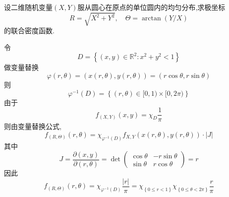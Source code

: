 \documentclass[../main.tex]{subfiles}
\begin{document}
\begin{exercise}{}{}
设二维随机变量\((X,Y)\)服从圆心在原点的单位圆内的均匀分布,求极坐标
\[
R=\sqrt{X^{2}+Y^{2}},\quad \Theta=\operatorname{arctan}(Y/X)
\]
的联合密度函数.
\end{exercise}

\begin{solution}
     令 \[
     D= \left\{\left( x,y \right)\in \mathbb{R} ^{2}:  x^{2}+ y^{2}< 1 \right\}
     \] 做变量替换 \[
     \varphi \left( r, \theta  \right)= \left( x\left( r, \theta  \right),y\left( r, \theta  \right)   \right)= \left( r\cos  \theta , r\sin  \theta  \right) 
      \] 则 \[
       \varphi ^{-1} \left( D \right)= \left\{ \left( r, \theta  \right)\in [0,1)\times [0,2 \pi )  \right\} 
      \]由于\[
      f_{\left( X,Y \right) }\left( x,y \right)=\chi _{D}\frac{1 }{ \pi  }  
      \]则由变量替换公式,  \[
      f_{\left( R, \Theta  \right) }\left( r, \theta  \right)=\chi _{ \varphi ^{-1} \left( D \right) } f_{X,Y}\left( x\left( r, \theta  \right),y\left( r, \theta  \right)   \right)  \cdot \left| J \right| 
      \]其中 \[
      J= \frac{\partial \left( x,y \right) }{\partial \left( r, \theta  \right) }= \det \begin{pmatrix} 
          \cos  \theta &-r\sin  \theta \\ 
           \sin  \theta &r\cos  \theta  
      \end{pmatrix}= r 
      \]因此 \[
      f_{\left( R, \Theta  \right) }\left( r, \theta  \right)=\chi _{ \varphi ^{-1} \left( D \right) }\frac{\left| r \right|  }{ \pi  }= \chi _{\left\{ 0\le r< 1 \right\}}\chi _{\left\{ 0\le  \theta < 2 \pi  \right\}}\frac{r }{ \pi  }  
      \]
\end{solution}
\end{document}

